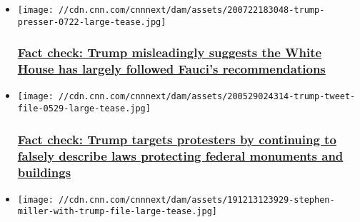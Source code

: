 \begin{itemize}
\item
  \href{/2020/07/29/politics/fact-check-trump-misleading-followed-fauci-recommendations/index.html}{}

  \texttt{[image: //cdn.cnn.com/cnnnext/dam/assets/200722183048-trump-presser-0722-large-tease.jpg]}

  \hypertarget{fact-check-trump-misleadingly-suggests-the-white-house-has-largely-followed-faucis-recommendations}{%
  \subsubsection{\texorpdfstring{\href{/2020/07/29/politics/fact-check-trump-misleading-followed-fauci-recommendations/index.html}{Fact
  check: Trump misleadingly suggests the White House has largely
  followed Fauci's
  recommendations}}{Fact check: Trump misleadingly suggests the White House has largely followed Fauci's recommendations}}\label{fact-check-trump-misleadingly-suggests-the-white-house-has-largely-followed-faucis-recommendations}}
\item
  \href{/2020/07/28/politics/trump-monument-act-prison-vandalism-fact-check/index.html}{}

  \texttt{[image: //cdn.cnn.com/cnnnext/dam/assets/200529024314-trump-tweet-file-0529-large-tease.jpg]}

  \hypertarget{fact-check-trump-targets-protesters-by-continuing-to-falsely-describe-laws-protecting-federal-monuments-and-buildings}{%
  \subsubsection{\texorpdfstring{\href{/2020/07/28/politics/trump-monument-act-prison-vandalism-fact-check/index.html}{Fact
  check: Trump targets protesters by continuing to falsely describe laws
  protecting federal monuments and
  buildings}}{Fact check: Trump targets protesters by continuing to falsely describe laws protecting federal monuments and buildings}}\label{fact-check-trump-targets-protesters-by-continuing-to-falsely-describe-laws-protecting-federal-monuments-and-buildings}}
\item
  \href{/2020/07/31/politics/mail-voting-verification-stephen-miller-fact-check/index.html}{}

  \texttt{[image: //cdn.cnn.com/cnnnext/dam/assets/191213123929-stephen-miller-with-trump-file-large-tease.jpg]}

  \hypertarget{fact-check-stephen-miller-carries-water-for-trump-in-promoting-mail-in-voting-conspiracies}{%
}
\end{itemize}
